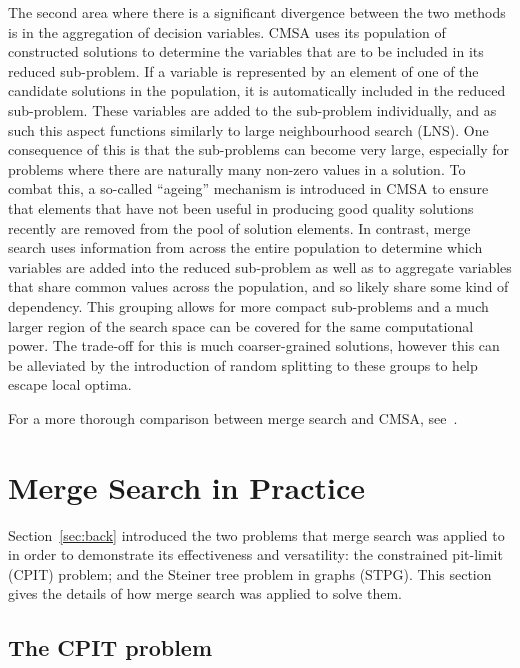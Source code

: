 \documentclass[journal]{IEEEtran}
\begin{document}
The second area where there is a significant divergence between the two methods is in the aggregation of decision variables. CMSA uses its population of constructed solutions to determine the variables that are to be included in its reduced sub-problem. If a variable is represented by an element of one of the candidate solutions in the population, it is automatically included in the reduced sub-problem. These variables are added to the sub-problem individually, and as such this aspect functions similarly to large neighbourhood search (LNS). One consequence of this is that the sub-problems can become very large, especially for problems where there are naturally many non-zero values in a solution. To combat this, a so-called ``ageing'' mechanism is introduced in CMSA to ensure that elements that have not been useful in producing good quality solutions recently are removed from the pool of solution elements. In contrast, merge search uses information from across the entire population to determine which variables are added into the reduced sub-problem as well as to aggregate variables that share common values across the population, and so likely share some kind of dependency. This grouping allows for more compact sub-problems and a much larger region of the search space can be covered for the same computational power. The trade-off for this is much coarser-grained solutions, however this can be alleviated by the introduction of random splitting to these groups to help escape local optima.

For a more thorough comparison between merge search and CMSA, see~\cite{ms-vs-cmsa}.

\section{Merge Search in Practice}\label{sec:pract}
Section~\ref{sec:back} introduced the two problems that merge search was applied to in order to demonstrate its effectiveness and versatility: the constrained pit-limit (CPIT) problem; and the Steiner tree problem in graphs (STPG). This section gives the details of how merge search was applied to solve them.

\subsection{The CPIT problem}
\end{document}
